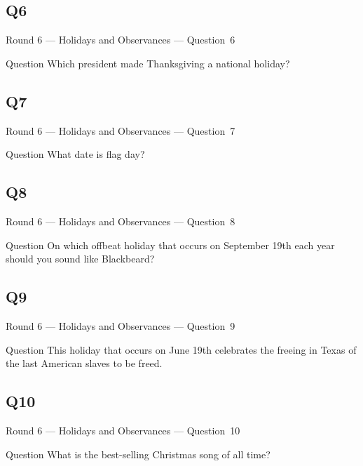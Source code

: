 \documentclass[11pt]{beamer}
\begin{document}
\subsection*{Q6}
\begin{frame}[t]{Round 6 --- Holidays and Observances --- \mbox{Question 6}}
\begin{block}{Question}
Which president made Thanksgiving a national holiday?
\end{block}
\end{frame}
\subsection*{Q7}
\begin{frame}[t]{Round 6 --- Holidays and Observances --- \mbox{Question 7}}
\begin{block}{Question}
What date is flag day?
\end{block}
\end{frame}
\subsection*{Q8}
\begin{frame}[t]{Round 6 --- Holidays and Observances --- \mbox{Question 8}}
\begin{block}{Question}
On which offbeat holiday that occurs on September 19th each year should you sound like Blackbeard?
\end{block}
\end{frame}
\subsection*{Q9}
\begin{frame}[t]{Round 6 --- Holidays and Observances --- \mbox{Question 9}}
\begin{block}{Question}
This holiday that occurs on June 19th celebrates the freeing in Texas of the last American slaves to be freed.
\end{block}
\end{frame}
\subsection*{Q10}
\begin{frame}[t]{Round 6 --- Holidays and Observances --- \mbox{Question 10}}
\begin{block}{Question}
What is the best-selling Christmas song of all time?
\end{block}
\end{frame}
\end{document}
